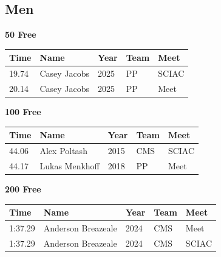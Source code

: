 \subsection{Men}
\vspace{1.2em}
\noindent\begin{minipage}[t]{0.98\textwidth}
\centering
\textbf{\textcolor{teamprimary}{50 Free}}\par
\vspace{0.5em}
\centering
\small
\renewcommand{\arraystretch}{1.0}
\setlength{\tabcolsep}{4pt}
\begin{tabular}{@{}p{2.5cm}p{4.5cm}p{1.5cm}p{2.5cm}p{2.5cm}@{}}
\toprule
\textbf{Time} & \textbf{Name} & \textbf{Year} & \textbf{Team} & \textbf{Meet} \\
\midrule
19.74 & Casey Jacobs & 2025 & PP & SCIAC \\
20.14 & Casey Jacobs & 2025 & PP & Meet \\
\bottomrule
\end{tabular}
\end{minipage}
\vspace{1.2em}
\noindent\begin{minipage}[t]{0.98\textwidth}
\centering
\textbf{\textcolor{teamprimary}{100 Free}}\par
\vspace{0.5em}
\centering
\small
\renewcommand{\arraystretch}{1.0}
\setlength{\tabcolsep}{4pt}
\begin{tabular}{@{}p{2.5cm}p{4.5cm}p{1.5cm}p{2.5cm}p{2.5cm}@{}}
\toprule
\textbf{Time} & \textbf{Name} & \textbf{Year} & \textbf{Team} & \textbf{Meet} \\
\midrule
44.06 & Alex Poltash & 2015 & CMS & SCIAC \\
44.17 & Lukas Menkhoff & 2018 & PP & Meet \\
\bottomrule
\end{tabular}
\end{minipage}
\vspace{1.2em}
\noindent\begin{minipage}[t]{0.98\textwidth}
\centering
\textbf{\textcolor{teamprimary}{200 Free}}\par
\vspace{0.5em}
\centering
\small
\renewcommand{\arraystretch}{1.0}
\setlength{\tabcolsep}{4pt}
\begin{tabular}{@{}p{2.5cm}p{4.5cm}p{1.5cm}p{2.5cm}p{2.5cm}@{}}
\toprule
\textbf{Time} & \textbf{Name} & \textbf{Year} & \textbf{Team} & \textbf{Meet} \\
\midrule
1:37.29 & Anderson Breazeale & 2024 & CMS & Meet \\
1:37.29 & Anderson Breazeale & 2024 & CMS & SCIAC \\
\bottomrule
\end{tabular}
\end{minipage}
